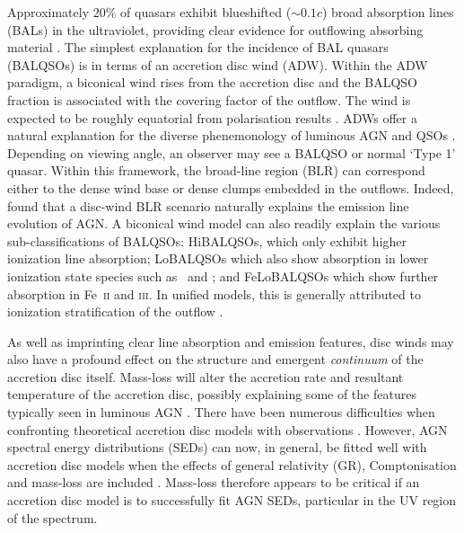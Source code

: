 \documentclass[useAMS,usenatbib]{mn2e_x}
\begin{document}
Approximately $20\%$ of quasars exhibit blueshifted ($\sim 0.1c$)
broad absorption lines (BALs) in the ultraviolet,
providing clear evidence for outflowing absorbing material
\citep{weymann1991, reichard2003, knigge2008, turnermiller2009, allen2011}.
The simplest explanation for the incidence of 
BAL quasars (BALQSOs) is in terms of an accretion disc wind (ADW). 
Within the ADW paradigm, a biconical wind rises from 
the accretion disc and the BALQSO fraction is associated with
the covering factor of the outflow. 
The wind is expected to be roughly equatorial from polarisation results
\citep{goodrich1995, cohen1995}.
ADWs offer a natural explanation for the
diverse phenemonology of luminous AGN and QSOs \citep[e.g.][]{MCGV95, elvis2000}. 
Depending on viewing angle, an observer 
may see a BALQSO or normal `Type 1' quasar.
Within this framework, the broad-line region (BLR) can 
correspond either to the dense wind base or dense clumps embedded
in the outflows. Indeed, \cite{elitzur2014} found that a disc-wind BLR scenario
naturally explains the emission line evolution of AGN.
A biconical wind model can also readily explain the various sub-classifications of BALQSOs: 
HiBALQSOs, which only exhibit higher ionization line absorption; LoBALQSOs which also show
absorption in lower ionization state species such as \mg\ and \al; and
FeLoBALQSOs which show further absorption in Fe~\textsc{ii} and \textsc{iii}.
In unified models, this is generally attributed to ionization stratification
of the outflow \citep[e.g.][]{elvis2000}.

As well as imprinting clear line absorption and emission
features, disc winds may also have a profound effect on the structure and 
emergent {\em continuum} of the accretion disc itself.
Mass-loss will alter the accretion rate and resultant 
temperature of the accretion disc, possibly explaining some 
of the features typically seen in luminous AGN \citep{knigge1999,laordavis2014}.
There have been numerous difficulties when confronting 
theoretical accretion disc models with observations 
\citep[see e.g.][]{blaes1998}. However, AGN spectral energy distributions (SEDs) can now, 
in general, be fitted well with accretion disc models
when the effects of general relativity (GR), Comptonisation
and mass-loss are included \citep{capellupo2015}. Mass-loss therefore appears to be 
critical if an accretion disc model is to successfully fit AGN SEDs, 
particular in the UV region of the spectrum.
\end{document}

